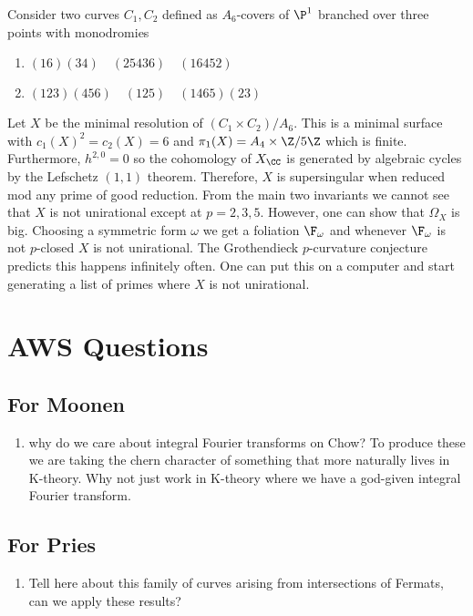 \documentclass[12pt]{article}
\begin{document}
\begin{example}
Consider two curves $C_1, C_2$ defined as $A_6$-covers of $\P^1$ branched over three points with monodromies
\begin{enumerate}
\item $(1 6)(3 4) \quad (25436) \quad (16452)$
\item $(123)(456) \quad (125) \quad (1465)(23)$
\end{enumerate}
Let $X$ be the minimal resolution of $(C_1 \times C_2)/A_6$. This is a minimal surface with $c_1(X)^2 = c_2(X) = 6$ and $\pi_1(X) = A_4 \times \Z / 5 \Z$ which is finite. Furthermore, $h^{2,0} = 0$ so the cohomology of $X_{\CC}$ is generated by algebraic cycles by the Lefschetz $(1,1)$ theorem. Therefore, $X$ is supersingular when reduced mod any prime of good reduction. From the main two invariants we cannot see that $X$ is not unirational except at $p = 2,3,5$. However, one can show that $\Omega_X$ is big. Choosing a symmetric form $\omega$ we get a foliation $\F_\omega$ and whenever $\F_{\omega}$ is not $p$-closed $X$ is not unirational. The Grothendieck $p$-curvature conjecture predicts this happens infinitely often. One can put this on a computer and start generating a list of primes where $X$ is not unirational.  
\end{example}


\section{AWS Questions}

\subsection{For Moonen}

\begin{enumerate}
\item why do we care about integral Fourier transforms on Chow? To produce these we are taking the chern character of something that more naturally lives in K-theory. Why not just work in K-theory where we have a god-given integral Fourier transform. 
\end{enumerate}

\subsection{For Pries}

\begin{enumerate}
\item Tell here about this family of curves arising from intersections of Fermats, can we apply these results?
\end{enumerate}
\end{document}
